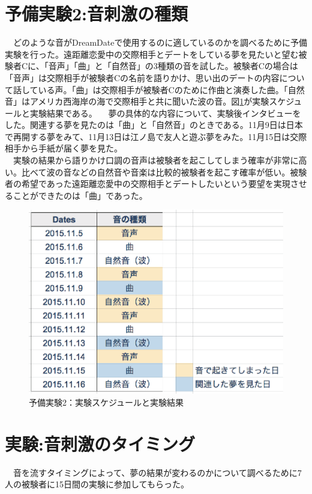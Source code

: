 \section{予備実験2:音刺激の種類}
　どのような音がDreamDateで使用するのに適しているのかを調べるために予備実験を行った。遠距離恋愛中の交際相手とデートをしている夢を見たいと望む被験者Cに、「音声」「曲」と「自然音」の3種類の音を試した。被験者Cの場合は「音声」は交際相手が被験者Cの名前を語りかけ、思い出のデートの内容について話している声。「曲」は交際相手が被験者Cのために作曲と演奏した曲。「自然音」はアメリカ西海岸の海で交際相手と共に聞いた波の音。図\ref{experiment2}が実験スケジュールと実験結果である。
　夢の具体的な内容について、実験後インタビューをした。関連する夢を見たのは「曲」と「自然音」のときである。11月9日は日本で再開する夢をみて、11月13日は江ノ島で友人と遊ぶ夢をみた。11月15日は交際相手から手紙が届く夢を見た。\\
　実験の結果から語りかけ口調の音声は被験者を起こしてしまう確率が非常に高い。比べて波の音などの自然音や音楽は比較的被験者を起こす確率が低い。被験者の希望であった遠距離恋愛中の交際相手とデートしたいという要望を実現させることができたのは「曲」であった。

\begin{figure}[htbp]
\begin{center}
\includegraphics[width=13cm]{eps/schedule1.eps}
\caption{予備実験2：実験スケジュールと実験結果}
\label{experiment2}
\end{center}
\end{figure}

\section{実験:音刺激のタイミング}
　音を流すタイミングによって、夢の結果が変わるのかについて調べるために7人の被験者に15日間の実験に参加してもらった。


